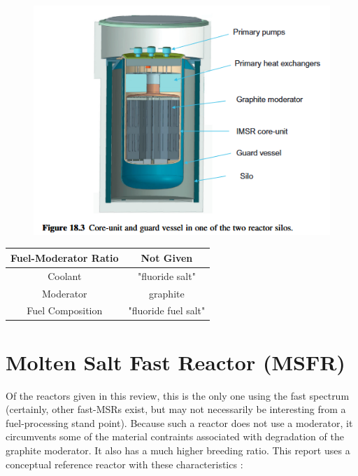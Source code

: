 \documentclass[letterpaper]{article}
\begin{document}
\begin{figure}[H]
  \centering
  \includegraphics[width=1.0\linewidth]{figures/IMSRsource2.png}
  \label{fig:fig9}
\end{figure}

\begin{center}
\begin{tabular}{|c|c|}
\hline
Fuel-Moderator Ratio & Not Given \\
\hline
Coolant & "fluoride salt" \\
\hline
Moderator & graphite \\
\hline
Fuel Composition & "fluoride fuel salt" \\
\hline
\end{tabular}
\end{center}

\section{Molten Salt Fast Reactor (MSFR)}
Of the reactors given in this review, this is the only one using the fast spectrum (certainly, other fast-MSRs exist, but may not necessarily be interesting from a fuel-processing stand point).  Because such a reactor does not use a moderator, it circumvents some of the material contraints associated with degradation of the graphite moderator.  It also has a much higher breeding ratio.  This report uses a conceptual reference reactor with these characteristics \cite{rouch_preliminary_2014}: 
\end{document}
